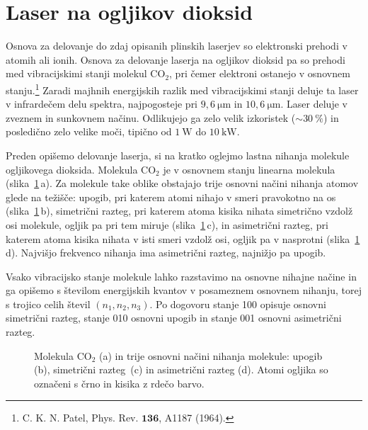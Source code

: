 \section{Laser na ogljikov dioksid}
Osnova za delovanje do zdaj opisanih plinskih laserjev so elektronski prehodi
v atomih ali ionih. Osnova za delovanje laserja na ogljikov dioksid pa so 
prehodi med vibracijskimi stanji molekul 
CO$_2$, pri čemer elektroni ostanejo v osnovnem stanju.\footnote{C. K. N. Patel,
Phys. Rev. $\mathbf{136}$, A1187 (1964).}
Zaradi majhnih energijskih razlik med vibracijskimi stanji deluje
ta laser v infrardečem delu spektra, najpogosteje pri 
$9,6~\si{\micro\metre}$ in $10,6~\si{\micro\metre}$. Laser deluje v zveznem
in sunkovnem načinu. Odlikujejo ga zelo velik izkoristek ($\sim 30~\%$) in 
posledično zelo velike moči, tipično od $1~\si{\watt}$ do $10~\si{\kilo\watt}$. 

Preden opišemo delovanje laserja, si na kratko oglejmo lastna nihanja molekule 
ogljikovega dioksida. Molekula CO$_2$ je v osnovnem stanju linearna molekula 
(slika~\ref{fig:CO2}\,a). 
Za molekule take oblike obstajajo trije osnovni načini nihanja atomov glede na težišče:
upogib, pri katerem atomi nihajo v smeri pravokotno na os (slika~\ref{fig:CO2}\,b),
simetrični razteg, pri katerem atoma kisika nihata simetrično vzdolž osi molekule, ogljik pa pri tem miruje (slika~\ref{fig:CO2}\,c), in asimetrični razteg, pri 
katerem atoma kisika nihata v isti smeri vzdolž osi, ogljik pa v nasprotni 
(slika~\ref{fig:CO2}\,d). Najvišjo frekvenco nihanja ima asimetrični razteg,
najnižjo pa upogib. 

Vsako vibracijsko stanje molekule lahko razstavimo na osnovne nihajne načine in 
ga opišemo s številom energijskih kvantov v posameznem osnovnem nihanju, 
torej s trojico celih števil $(n_1,n_2,n_3)$. Po dogovoru stanje 100 opisuje
osnovni simetrični razteg, stanje 010 osnovni upogib in stanje 001 
osnovni asimetrični razteg.

\begin{figure}[ht]
\centering
\def\svgwidth{110truemm} 

\caption{Molekula CO$_2$ (a) in trije osnovni načini nihanja molekule:
upogib (b), simetrični razteg~(c) in asimetrični razteg (d). Atomi ogljika so
označeni s črno
in kisika z rdečo barvo.}
\label{fig:CO2}
\end{figure}
\newpage

